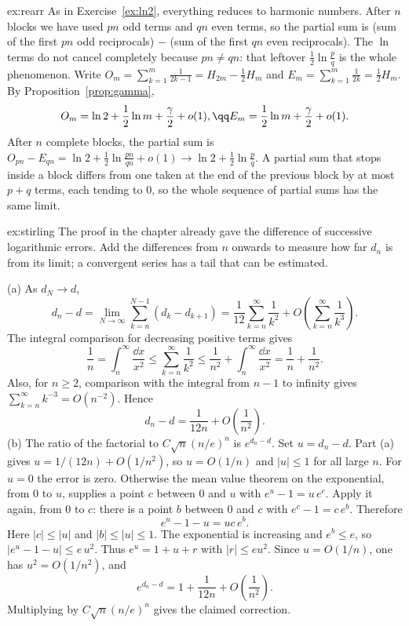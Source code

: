 \begin{solution}{ex:rearr}
\idea As in Exercise~\ref{ex:ln2}, everything reduces to harmonic numbers. After $n$ blocks we have used $pn$ odd terms and $qn$ even terms, so the partial sum is (sum of the first $pn$ odd reciprocals) $-$ (sum of the first $qn$ even reciprocals). The $\ln$ terms do not cancel completely because $pn\ne qn$: that leftover $\frac12\ln\frac pq$ is the whole phenomenon.
\writeup Write $O_m=\sum_{k=1}^m\frac1{2k-1}=H_{2m}-\frac12H_m$ and $E_m=\sum_{k=1}^m\frac1{2k}=\frac12H_m$. By Proposition~\ref{prop:gamma},
\[
\begin{gathered}O_m=\ln2+\frac12\ln m+\frac\gamma2+o(1),\qq E_m=\frac12\ln m+\frac\gamma2+o(1).\end{gathered}
\]
After $n$ complete blocks, the partial sum is
$O_{pn}-E_{qn}=\ln2+\frac12\ln\frac{pn}{qn}+o(1)\to\ln2+\frac12\ln\frac pq$.
A partial sum that stops inside a block differs from one taken at the end of the previous block by at most $p+q$ terms, each tending to $0$, so the whole sequence of
partial sums has the same limit.
\end{solution}

\begin{solution}{ex:stirling}
\idea The proof in the chapter already gave the difference of successive logarithmic errors. Add the differences from $n$ onwards to measure how far $d_n$ is from its limit; a convergent series has a tail that can be estimated.

\writeup (a) As $d_N\to d$,
\[
d_n-d=\lim_{N\to\infty}\sum_{k=n}^{N-1}(d_k-d_{k+1})
=\frac1{12}\sum_{k=n}^\infty\frac1{k^2}
+O\left(\sum_{k=n}^\infty\frac1{k^3}\right).
\]
The integral comparison for decreasing positive terms gives
\[
\frac1n=\int_n^\infty\frac{\dd x}{x^2}
\le\sum_{k=n}^\infty\frac1{k^2}
\le\frac1{n^2}+\int_n^\infty\frac{\dd x}{x^2}
=\frac1n+\frac1{n^2}.
\]
Also, for $n\ge2$, comparison with the integral from $n-1$ to infinity gives
$\sum_{k=n}^\infty k^{-3}=O(n^{-2})$. Hence
\[
d_n-d=\frac1{12n}+O\left(\frac1{n^2}\right).
\]
(b) The ratio of the factorial to $C\sqrt n(n/e)^n$ is $e^{d_n-d}$. Set $u=d_n-d$. Part (a) gives $u=1/(12n)+O(1/n^2)$, so $u=O(1/n)$ and $|u|\le1$ for all large $n$. For $u=0$ the error is zero. Otherwise the mean value theorem on the exponential, from $0$ to $u$, supplies a point $c$ between $0$ and $u$ with $e^u-1=u\,e^c$. Apply it again, from $0$ to $c$: there is a point $b$ between $0$ and $c$ with $e^c-1=c\,e^b$. Therefore
\[
e^u-1-u=uc\,e^b.
\]
Here $|c|\le|u|$ and $|b|\le|u|\le1$. The exponential is increasing and $e^b\le e$, so $|e^u-1-u|\le e\,u^2$. Thus $e^u=1+u+r$ with $|r|\le e u^2$. Since $u=O(1/n)$, one has $u^2=O(1/n^2)$, and
\[
e^{d_n-d}=1+\frac1{12n}+O\left(\frac1{n^2}\right).
\]
Multiplying by $C\sqrt n(n/e)^n$ gives the claimed correction.
\end{solution}


